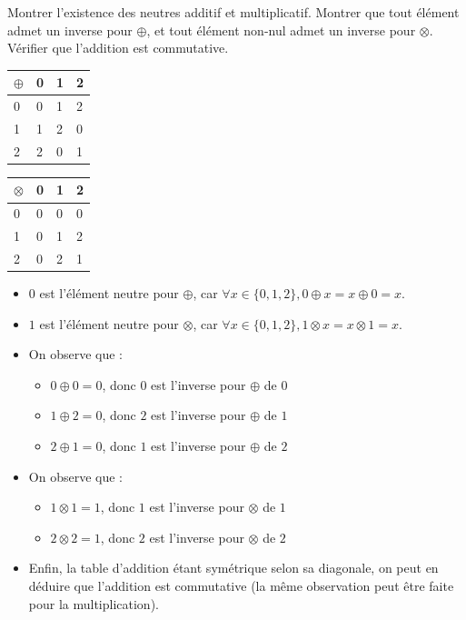 \documentclass[a4paper, 10pt]{report}
\begin{document}
	\noindent
	Montrer l'existence des neutres additif et multiplicatif. Montrer
	que tout élément admet un inverse pour $\oplus$, et tout élément
	non-nul admet un inverse pour $\otimes$.\\
	Vérifier que l'addition	est commutative.
	
	\colorbox{solution}
	{
		\begin{minipage}{0.9\textwidth}
			\vspace{6pt}
			\begin{center}
				\begin{tabular}{l|l|l|l|}
					$\oplus$ & 0 & 1 & 2 \\
					\hline
					0 & 0 & 1 & 2 \\
					\hline
					1 & 1 & 2 & 0 \\
					\hline
					2 & 2 & 0 & 1 \\
					\hline
				\end{tabular}
				\qquad
				\begin{tabular}{l|l|l|l|}
					$\otimes$ & 0 & 1 & 2 \\
					\hline
					0 & 0 & 0 & 0 \\
					\hline
					1 & 0 & 1 & 2 \\
					\hline
					2 & 0 & 2 & 1 \\
					\hline
				\end{tabular}
			\end{center}
			
			\begin{itemize}
				\item $0$ est l'élément neutre pour $\oplus$, car
				$\forall x \in \{0, 1, 2\}, 0 \oplus x = x \oplus 0 = x$.
				\item $1$ est l'élément neutre pour $\otimes$, car
				$\forall x \in \{0, 1, 2\}, 1 \otimes x = x \otimes 1 = x$.
				\item On observe que :
				\begin{itemize}
					\item $0 \oplus 0 = 0$, donc $0$ est l'inverse
					pour $\oplus$ de $0$
					\item $1 \oplus 2 = 0$, donc $2$ est l'inverse
					pour $\oplus$ de $1$
					\item $2 \oplus 1 = 0$, donc $1$ est l'inverse
					pour $\oplus$ de $2$
				\end{itemize}
				\item On observe que :
				\begin{itemize}
					\item $1 \otimes 1 = 1$, donc $1$ est l'inverse
					pour $\otimes$ de $1$
					\item $2 \otimes 2 = 1$, donc $2$ est l'inverse
					pour $\otimes$ de $2$
				\end{itemize}
				\item Enfin, la table d'addition étant symétrique selon
				sa diagonale, on peut en déduire que l'addition est
				commutative (la même observation peut être faite
				pour la multiplication).
			\end{itemize}
		\end{minipage}
	}
\end{document}
